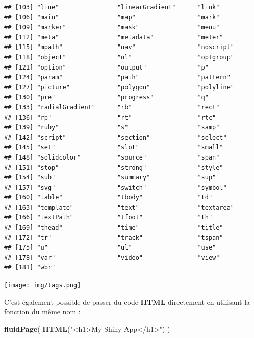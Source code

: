 \documentclass[
]{article}
\newenvironment{Shaded}{\begin{snugshade}}{\end{snugshade}}
\newcommand{\FunctionTok}[1]{\textcolor[rgb]{0.13,0.29,0.53}{\textbf{#1}}}
\newcommand{\NormalTok}[1]{#1}
\newcommand{\StringTok}[1]{\textcolor[rgb]{0.31,0.60,0.02}{#1}}
\begin{document}
\begin{verbatim}
## [103] "line"                "linearGradient"      "link"               
## [106] "main"                "map"                 "mark"               
## [109] "marker"              "mask"                "menu"               
## [112] "meta"                "metadata"            "meter"              
## [115] "mpath"               "nav"                 "noscript"           
## [118] "object"              "ol"                  "optgroup"           
## [121] "option"              "output"              "p"                  
## [124] "param"               "path"                "pattern"            
## [127] "picture"             "polygon"             "polyline"           
## [130] "pre"                 "progress"            "q"                  
## [133] "radialGradient"      "rb"                  "rect"               
## [136] "rp"                  "rt"                  "rtc"                
## [139] "ruby"                "s"                   "samp"               
## [142] "script"              "section"             "select"             
## [145] "set"                 "slot"                "small"              
## [148] "solidcolor"          "source"              "span"               
## [151] "stop"                "strong"              "style"              
## [154] "sub"                 "summary"             "sup"                
## [157] "svg"                 "switch"              "symbol"             
## [160] "table"               "tbody"               "td"                 
## [163] "template"            "text"                "textarea"           
## [166] "textPath"            "tfoot"               "th"                 
## [169] "thead"               "time"                "title"              
## [172] "tr"                  "track"               "tspan"              
## [175] "u"                   "ul"                  "use"                
## [178] "var"                 "video"               "view"               
## [181] "wbr"
\end{verbatim}

\texttt{[image: img/tags.png]}

C'est également possible de passer du code \textbf{HTML} directement en
utilisant la fonction du même nom :

\begin{Shaded}
\begin{Highlighting}[]
\FunctionTok{fluidPage}\NormalTok{(}
  \FunctionTok{HTML}\NormalTok{(}\StringTok{"\textless{}h1\textgreater{}My Shiny App\textless{}/h1\textgreater{}"}\NormalTok{) }
\NormalTok{)}
\end{Highlighting}
\end{Shaded}
\end{document}
